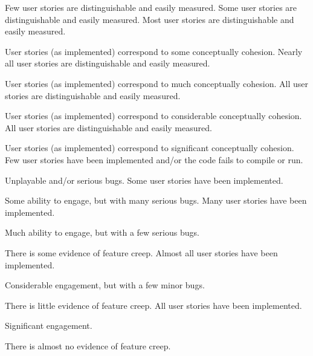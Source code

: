 \documentclass{../../fal_assignment}
\begin{document}
\begin{markingrubric}
%
        \grade \fail Few user stories are distinguishable and easily measured.
        \grade Some user stories are distinguishable and easily measured.
        \grade Most user stories are distinguishable and easily measured.
            \par User stories (as implemented) correspond to some conceptually cohesion.
        \grade Nearly all user stories are distinguishable and easily measured.
            \par User stories (as implemented) correspond to much conceptually cohesion.
        \grade All user stories are distinguishable and easily measured.
            \par User stories (as implemented) correspond to considerable conceptually cohesion.
        \grade All user stories are distinguishable and easily measured.
            \par User stories (as implemented) correspond to significant conceptually cohesion.
%
        \grade \fail Few user stories have been implemented  and/or the code fails to compile or run.
            \par Unplayable and/or serious bugs.
        \grade Some user stories have been implemented.
            \par Some ability to engage, but with many serious bugs.
        \grade Many user stories have been implemented.
            \par Much ability to engage, but with a few serious bugs.
            \par There is some evidence of feature creep.
        \grade Almost all user stories have been implemented.
            \par Considerable engagement, but with a few minor bugs.
            \par There is little evidence of feature creep.
        \grade All user stories have been implemented.
            \par Significant engagement.
            \par There is almost no evidence of feature creep.

\end{markingrubric}
\end{document}
